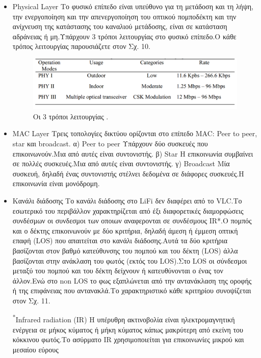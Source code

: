 \documentclass[conference]{IEEEtran}
\begin{document}
\begin{itemize}
	\item Physical Layer
Το φυσικό επίπεδο είναι υπεύθυνο για τη μετάδοση και τη λήψη, την ενεργοποίηση και την απενεργοποίηση του οπτικού πομποδέκτη και την ανίχνευση της κατάστασης του καναλιού μετάδοσης, είναι σε κατάσταση αδράνειας ή μη.Υπάρχουν 3 τρόποι λειτουργίας στο φυσικό επίπεδο.Ο κάθε τρόπος λειτουργίας παρουσιάζετε στον Σχ. 10.
\begin{figure}[h]
  \includegraphics[width=\linewidth]{10.png}
  \caption{Οι 3 τρόποι λειτουργίας .} 
\end{figure}

\item MAC Layer
Τρεις τοπολογίες δικτύου ορίζονται στο επίπεδο MAC: Peer to peer, star και broadcast.
α) Peer to peer
Υπάρχουν δύο συσκευές που επικοινωνούν.Μια από αυτές είναι συντονιστής.
β) Star
Η επικοινωνία συμβαίνει σε πολλές συσκευές.Μια από αυτές είναι συντονιστής.
γ) Broadcast
Μία συσκευή, δηλαδή ένας συντονιστής στέλνει δεδομένα σε διάφορες συσκευές.Η επικοινωνία είναι μονόδρομη.

 \item Κανάλι διάδοσης
Το κανάλι διάδοσης στο LiFi δεν διαφέρει από το VLC.Το  εσωτερικό  του περιβάλλον χαρακτηρίζεται από έξι διαφορετικές διαμορφώσεις συνδέσμων οι συνδεσμοι των οποιων αναφερονται σε συνδέσμους IR*.Ο πομπός και ο δέκτης επικοινωνούν με δύο κριτήρια, δηλαδή άμεση ή έμμεση οπτική επαφή (LOS) που απαιτείται στο κανάλι διάδοσης.Αυτά τα δύο κριτήρια βασίζονται στον βαθμό κατεύθυνσης του πομπού και του δέκτη (LOS) άλλα βασίζονται στην ανάκλαση του φωτός (εκτός του LOS).Στο LOS οι σύνδεσμοι μεταξύ του πομπού και του δέκτη δείχνουν ή κατευθύνονται ο ένας τον άλλον.Ενώ στο non LOS το φως εξαπλώνεται από την αντανάκλαση της οροφής ή της επιφάνειας που αντανακλά.Το χαρακτηριστικό κάθε κριτηρίου συνοψίζεται στον Σχ. 11.

{\footnotesize \textsuperscript{*}Infrared  radiation (IR) Η υπέρυθρη ακτινοβολία είναι ηλεκτρομαγνητική ενέργεια σε μήκος κύματος ή μήκη κύματος κάπως μακρύτερη από εκείνη του κόκκινου φωτός.Το ασύρματο IR χρησιμοποιείται για επικοινωνίες μικρού και μεσαίου εύρους}


\end{itemize}
\end{document}
